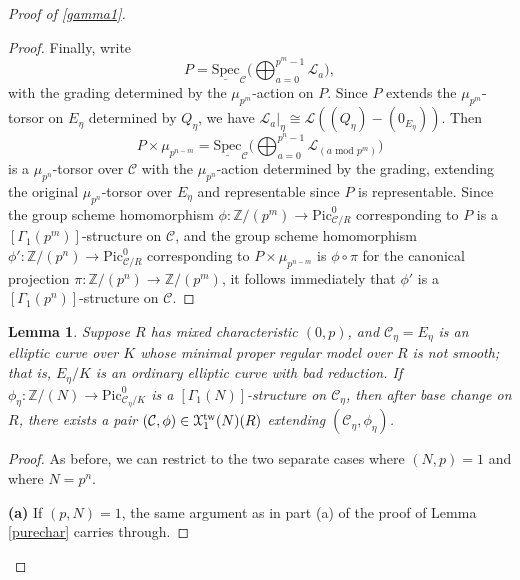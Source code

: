 \documentclass[11pt]{amsart}
\newtheorem{lemma}[subsection]{Lemma}
\theoremstyle{definition}
\begin{document}
\begin{proof}[Proof of \ref{gamma1}]
\begin{proof}
Finally, write 
\begin{displaymath}
P = \underline{\mathrm{Spec}}_{\mathcal{C}}\big( \bigoplus_{a = 0}^{p^m-1} {\mathcal{L}}_a \big),
\end{displaymath}
with the grading determined by the $\mu_{p^m}$-action on $P$. Since $P$ extends the $\mu_{p^m}$-torsor on $E_\eta$ determined by $Q_\eta$, we have ${\mathcal{L}}_a|_\eta \cong {\mathcal{L}}((Q_\eta)-(0_{E_\eta}))$. Then 
\begin{displaymath}
P \times \mu_{p^{n-m}} = \underline{\mathrm{Spec}}_{\mathcal{C}} \big( \bigoplus_{a = 0}^{p^n-1} {\mathcal{L}}_{(\textrm{$a$ mod $p^m$})} \big)
\end{displaymath}
is a $\mu_{p^n}$-torsor over ${\mathcal{C}}$ with the $\mu_{p^n}$-action determined by the grading, extending the original $\mu_{p^n}$-torsor over $E_\eta$ and representable since $P$ is representable. Since the group scheme homomorphism $\phi: \mathbb{Z}/(p^m) \rightarrow \mathrm{Pic}^0_{{\mathcal{C}}/R}$ corresponding to $P$ is a $[\Gamma_1(p^m)]$-structure on ${\mathcal{C}}$, and the group scheme homomorphism $\phi': \mathbb{Z}/(p^n) \rightarrow \mathrm{Pic}^0_{{\mathcal{C}}/R}$ corresponding to $P \times \mu_{p^{n-m}}$ is $\phi \circ \pi$ for the canonical projection $\pi: \mathbb{Z}/(p^n) \rightarrow \mathbb{Z}/(p^m)$, it follows immediately that $\phi'$ is a $[\Gamma_1(p^n)]$-structure on ${\mathcal{C}}$.
\end{proof}

\begin{lemma}\label{mixedchar}
Suppose $R$ has mixed characteristic $(0,p)$, and ${\mathcal{C}}_\eta = E_\eta$ is an elliptic curve over $K$ whose minimal proper regular model over $R$ is not smooth; that is, $E_\eta/K$ is an ordinary elliptic curve with bad reduction. If $\phi_\eta: \mathbb{Z}/(N) \rightarrow \mathrm{Pic}^0_{{\mathcal{C}}_\eta/K}$ is a $[\Gamma_1(N)]$-structure on ${\mathcal{C}}_\eta$, then after base change on $R$, there exists a pair $({\mathcal{C}},\phi) \in {\mathbf{\EuScript{X}}}^{\mathrm{tw}}_1(N)(R)$ extending $({\mathcal{C}}_\eta,\phi_\eta)$.
\end{lemma}
\begin{proof}
As before, we can restrict to the two separate cases where $(N,p) = 1$ and where $N = p^n$.

\textbf{(a)} If $(p,N) = 1$, the same argument as in part (a) of the proof of Lemma \ref{purechar} carries through.


\end{proof}
\end{proof}
\end{document}
